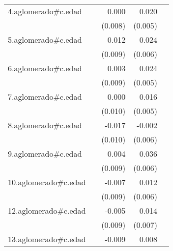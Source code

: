 {\begin{longtable}{l*{4}{D{.}{.}{-1}}}
\addlinespace
4.aglomerado#c.edad&                     &       0.000         &       0.020\sym{***}&                     \\
            &                     &     (0.008)         &     (0.005)         &                     \\
\addlinespace
5.aglomerado#c.edad&                     &       0.012         &       0.024\sym{***}&                     \\
            &                     &     (0.009)         &     (0.006)         &                     \\
\addlinespace
6.aglomerado#c.edad&                     &       0.003         &       0.024\sym{***}&                     \\
            &                     &     (0.009)         &     (0.005)         &                     \\
\addlinespace
7.aglomerado#c.edad&                     &       0.000         &       0.016\sym{**} &                     \\
            &                     &     (0.010)         &     (0.005)         &                     \\
\addlinespace
8.aglomerado#c.edad&                     &      -0.017         &      -0.002         &                     \\
            &                     &     (0.010)         &     (0.006)         &                     \\
\addlinespace
9.aglomerado#c.edad&                     &       0.004         &       0.036\sym{***}&                     \\
            &                     &     (0.009)         &     (0.006)         &                     \\
\addlinespace
10.aglomerado#c.edad&                     &      -0.007         &       0.012\sym{*}  &                     \\
            &                     &     (0.009)         &     (0.006)         &                     \\
\addlinespace
12.aglomerado#c.edad&                     &      -0.005         &       0.014\sym{*}  &                     \\
            &                     &     (0.009)         &     (0.007)         &                     \\
\addlinespace
13.aglomerado#c.edad&                     &      -0.009         &       0.008         &                     \\

\end{longtable}}
